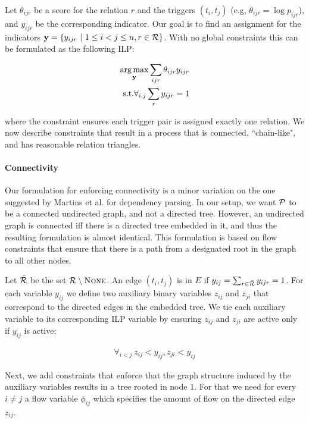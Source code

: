 Let $\theta_{ijr}$ be a score for the relation $r$ and the triggers $(t_i,t_j)$ (e.g, $\theta_{ijr}=\log p_{ijr}$), and $y_{ijr}$ be the corresponding indicator. Our goal is to find an assignment for the indicators $\mathbf{y}=\{y_{ijr} \ | \ 1 \leq i < j \leq n, r \in \mathcal{R} \}$. With no global constraints this can be formulated as the following ILP:

\begin{align}
\operatorname*{arg\,max}_{\mathbf{y}} \sum_{ijr} \theta_{ijr} y_{ijr} \\
\mbox{s.t.} \forall_{i,j} \sum_r y_{ijr}=1 \nonumber
\end{align}

\noindent where the constraint ensures each trigger pair is assigned exactly one relation. We now describe constraints that result in a process that is connected, ``chain-like", and has reasonable relation triangles.

\paragraph{Connectivity} 
Our formulation for enforcing connectivity is a minor variation on the one suggested by Martins et al.  for dependency parsing. In our setup, we want $\mathcal{P}$ to be a connected undirected graph, and not a directed tree. However, an undirected graph is connected iff there is a directed tree embedded in it, and thus the resulting formulation is almost identical. This formulation is based on flow constraints that ensure that there is a path from a designated root in the graph to all other nodes.

 Let $\bar{\mathcal{R}}$ be the set $\mathcal{R} \setminus \mbox{\textsc{None}}$. An edge $(t_i,t_j)$ is in $E$ if $y_{ij}=\sum_{r \in \bar{\mathcal{R}}} y_{ijr}=1$. For each variable $y_{ij}$ we define two auxiliary binary variables $z_{ij}$ and $z_{ji}$ that correspond to the directed edges in the embedded tree. We tie each auxiliary variable to its corresponding ILP variable by ensuring  $z_{ij}$ and $z_{ji}$ are active only if $y_{ij}$ is active:
 
\begin{align}
\forall_{i<j} \ z_{ij}<y_{ij}, z_{ji} < y_{ij}
\end{align}

Next, we add constraints that enforce that the graph structure induced by the auxiliary variables results in a tree rooted in node $1$. For that we need for every $i \neq j$ a flow variable $\phi_{ij}$ which specifies the amount of flow on the directed edge $z_{ij}$.

